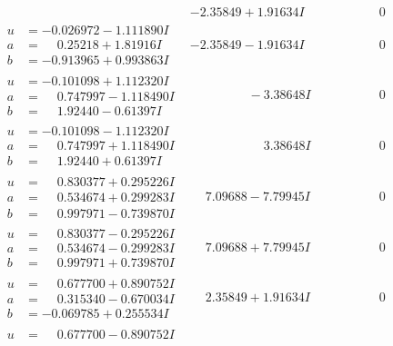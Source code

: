 \documentclass[1p]{elsarticle_modified}
\theoremstyle{definition}
\begin{document}
$$\begin{array}{c|c|c}
 & -2.35849 + 1.91634 I & \phantom{-0.000000 } 0 \\ \hline\begin{aligned}
u &= -0.026972 - 1.111890 I \\
a &= \phantom{-}0.25218 + 1.81916 I \\
b &= -0.913965 + 0.993863 I\end{aligned}
 & -2.35849 - 1.91634 I & \phantom{-0.000000 } 0 \\ \hline\begin{aligned}
u &= -0.101098 + 1.112320 I \\
a &= \phantom{-}0.747997 - 1.118490 I \\
b &= \phantom{-}1.92440 - 0.61397 I\end{aligned}
 & \phantom{-0.000000 } -3.38648 I & \phantom{-0.000000 } 0 \\ \hline\begin{aligned}
u &= -0.101098 - 1.112320 I \\
a &= \phantom{-}0.747997 + 1.118490 I \\
b &= \phantom{-}1.92440 + 0.61397 I\end{aligned}
 & \phantom{-0.000000 -}3.38648 I & \phantom{-0.000000 } 0 \\ \hline\begin{aligned}
u &= \phantom{-}0.830377 + 0.295226 I \\
a &= \phantom{-}0.534674 + 0.299283 I \\
b &= \phantom{-}0.997971 - 0.739870 I\end{aligned}
 & \phantom{-}7.09688 - 7.79945 I & \phantom{-0.000000 } 0 \\ \hline\begin{aligned}
u &= \phantom{-}0.830377 - 0.295226 I \\
a &= \phantom{-}0.534674 - 0.299283 I \\
b &= \phantom{-}0.997971 + 0.739870 I\end{aligned}
 & \phantom{-}7.09688 + 7.79945 I & \phantom{-0.000000 } 0 \\ \hline\begin{aligned}
u &= \phantom{-}0.677700 + 0.890752 I \\
a &= \phantom{-}0.315340 - 0.670034 I \\
b &= -0.069785 + 0.255534 I\end{aligned}
 & \phantom{-}2.35849 + 1.91634 I & \phantom{-0.000000 } 0 \\ \hline\begin{aligned}
u &= \phantom{-}0.677700 - 0.890752 I \\

\end{aligned}
\end{array}$$
\end{document}
